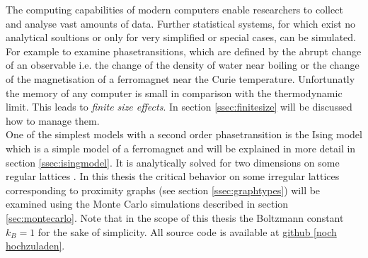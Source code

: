 The computing capabilities of modern computers enable researchers to
collect and analyse vast amounts of data.
Further statistical systems, for which exist no analytical soultions
or only for very simplified or special cases, can be simulated.
For example to examine phasetransitions, which are defined by the abrupt
change of an observable i.e. the change of the density of water near
boiling or the change of the magnetisation of a ferromagnet near the
Curie temperature. Unfortunatly the memory of any computer is small in
comparison with the thermodynamic limit.
This leads to \emph{finite size effects}. In section \ref{ssec:finitesize}
will be discussed how to manage them.\\
One of the simplest models with a second order phasetransition is the
Ising model \cite{Ising1925} which is a simple model of a ferromagnet
and will be explained in more detail in section \ref{ssec:isingmodel}.
It is analytically solved for two dimensions on some regular lattices
\cite{Onsager1944} \cite{Wannier1945}.
In this thesis the critical behavior on some irregular lattices
corresponding to proximity graphs (see section \ref{ssec:graphtypes})
will be examined using the Monte Carlo simulations described in section
\ref{sec:montecarlo}. Note that in the scope of this thesis
the Boltzmann constant \(k_{B}=1\) for the sake of simplicity.
All source code is available at \url{github [noch hochzuladen]}.
